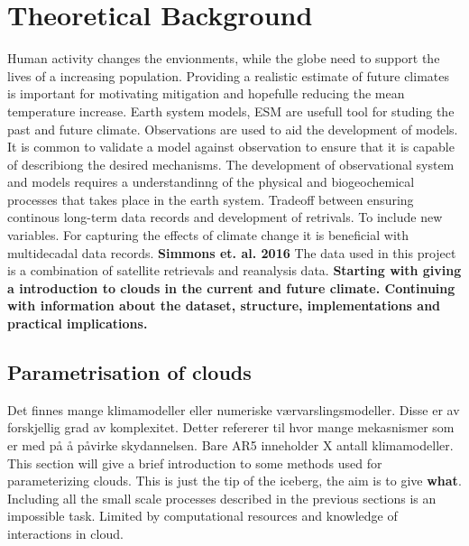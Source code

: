 \setcounter{chapter}{1} 
\chapter{Theoretical Background} \label{ch:theoretical_back}
Human activity changes the envionments, while the globe need to support the lives of a increasing population. Providing a realistic estimate of future climates is important for motivating mitigation and hopefulle reducing the mean temperature increase. Earth system models, ESM are usefull tool for studing the past and future climate. Observations are used to aid the development of models. It is common to validate a model against observation to ensure that it is capable of describiong the desired mechanisms. 
The development of observational system and models requires a understandinng of the physical and biogeochemical processes that takes place in the earth system. Tradeoff between ensuring continous long-term data records and development of retrivals. To include new variables. For capturing the effects of climate change it is beneficial with multidecadal data records. \textbf{Simmons et. al. 2016} The data used in this project is a combination of satellite retrievals and reanalysis data. \textbf{Starting with giving a introduction to clouds in the current and future climate. Continuing with information about the dataset, structure, implementations and practical implications.}



\section{Parametrisation of clouds} \label{sec:param_clouds}
Det finnes mange klimamodeller eller numeriske værvarslingsmodeller. Disse er av forskjellig grad av komplexitet. Detter refererer til hvor mange mekasnismer som er med på å påvirke skydannelsen. Bare AR5 inneholder X antall klimamodeller. This section will  give a brief introduction to some methods used for parameterizing clouds. This is just the tip of the iceberg, the aim is to give \textbf{what}. Including all the small scale processes described in the previous sections is
an impossible task. Limited by computational resources and knowledge of interactions in cloud. 

